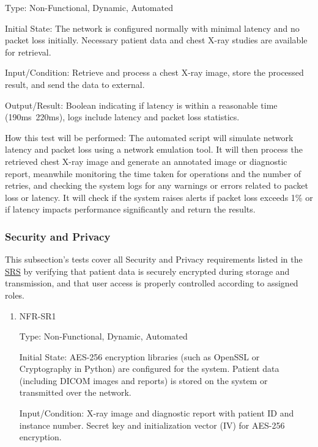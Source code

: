 \documentclass[12pt, titlepage]{article}
\begin{document}
\begin{enumerate}
\begin{enumerate}
\begin{enumerate}
\begin{enumerate}
\begin{enumerate}
Type: Non-Functional, Dynamic, Automated

Initial State: The network is configured normally with minimal latency and no packet loss initially. Necessary patient data and chest X-ray studies are available for retrieval.

Input/Condition: Retrieve and process a chest X-ray image, store the processed result, and send the data to external.

Output/Result: Boolean indicating if latency is within a reasonable time (190ms~220ms), logs include latency and packet loss statistics.

How this test will be performed: The automated script will simulate network latency and packet loss using a network emulation tool. It will then process the retrieved chest X-ray image and generate an annotated image or diagnostic report, meanwhile monitoring the time taken for operations and the number of retries, and checking the system logs for any warnings or errors related to packet loss or latency. It will check if the system raises alerts if packet loss exceeds 1\% or if latency impacts performance significantly and return the results.

\end{enumerate}

\subsubsection{Security and Privacy}

This subsection's tests cover all Security and Privacy requirements listed in the \href{https://github.com/RezaJodeiri/CXR-Capstone/blob/main/docs/SRS/SRS.pdf}{SRS} \citep{SRS}
 by verifying that patient data is securely encrypted during storage and transmission, and that user access is properly controlled according to assigned roles.

\begin{enumerate}

\item{NFR-SR1\\}\label{NFR-SR1}

Type: Non-Functional, Dynamic, Automated

Initial State: AES-256 encryption libraries (such as OpenSSL or Cryptography in Python) are configured for the system. Patient data (including DICOM images and reports) is stored on the system or transmitted over the network.

Input/Condition: X-ray image and diagnostic report with patient ID and instance number. Secret key and initialization vector (IV) for AES-256 encryption.


\end{enumerate}
\end{enumerate}
\end{enumerate}
\end{enumerate}
\end{enumerate}
\end{document}
